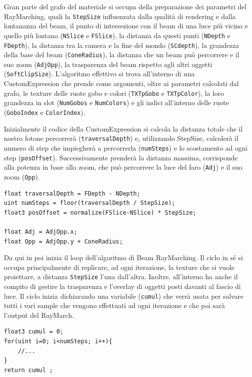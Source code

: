 \documentclass[main.tex]{subfiles}
\begin{document}
\noindent Gran parte del grafo del materiale si occupa della preparazione dei parametri del RayMarching, quali la \lstinline{StepSize} influenzata dalla qualità di rendering e dalla lontananza del beam, il punto di intersezione con il beam di una luce più vicino e quello più lontano (\lstinline{NSlice} e \lstinline{FSlice}), la distanza da questi punti (\lstinline{NDepth} e \lstinline{FDepth}), la distanza tra la camera e la fine del mondo (\lstinline{SCdepth}), la grandezza della base del beam (\lstinline{ConeRadius}), la distanza che un beam può percorrere e il suo zoom (\lstinline{AdjOpp}), la trasparenza del beam rispetto agli altri oggetti (\lstinline{SoftClipSize}). L'algoritmo effettivo si trova all'interno di una CustomExpression che prende come argomenti, oltre ai parametri calcolati dal grafo, le texture delle ruote gobo e colori (\lstinline{TXTpGobo} e \lstinline{TXTpColor}), la loro grandezza in slot (\lstinline{NumGobos} e \lstinline{NumColors}) e gli indici all'interno delle ruote (\lstinline{GoboIndex} e \lstinline{ColorIndex}). \newline

Inizialmente il codice della CustomExpression si calcola la distanza totale che il nostro fotone percorrerà (\lstinline{traversalDepth}) e, utilizzando StepSize, calcolerà il numero di step che impiegherà a percorrerla (\lstinline{numSteps}) e lo scostamento ad ogni step (\lstinline{posOffset}). Successivamente prenderà la distanza massima, corrisponde alla potenza in base allo zoom, che può percorrere la luce del faro (\lstinline{Adj}) e il suo zoom (\lstinline{Opp}).
\lstset{language=glsl}
\begin{lstlisting}
float traversalDepth = FDepth - NDepth;
uint numSteps = floor(traversalDepth / StepSize);
float3 posOffset = normalize(FSlice-NSlice) * StepSize;

float Adj = AdjOpp.x;
float Opp = AdjOpp.y + ConeRadius;
\end{lstlisting}

Da qui in poi inizia il loop dell'algoritmo di Beam RayMarching. Il ciclo in sé si occupa principalmente di replicare, ad ogni iterazione, la texture che si vuole proiettare, a distanza \lstinline{StepSize} l'una dall'altra. Inoltre, all'interno ha anche il compito di gestire la trasparenza e l'overlay di oggetti posti davanti al fascio di luce. Il ciclo inizia dichiarando una variabile (\lstinline{cumul}) che verrà usata per salvare tutti i vari sample che vengono effettuati ad ogni iterazione e che poi sarà l'output del RayMarch.
\begin{lstlisting}
float3 cumul = 0;
for(uint i=0; i<numSteps; i++){
    //...
}
return cumul ;
\end{lstlisting}
\end{document}
